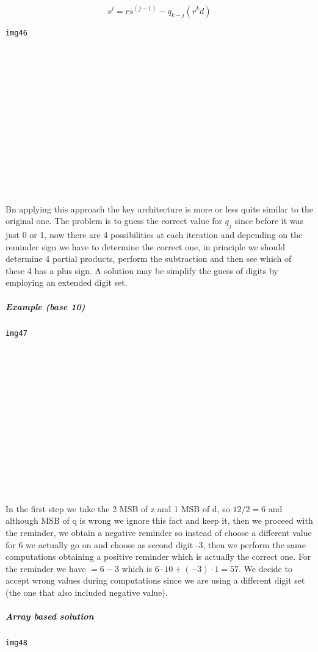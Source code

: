 $$s^{j}=rs^{(j-1)}-q_{k-j} (r^k d)$$

\begin{verbatim}
img46














\end{verbatim}

Bn applying this approach the key architecture is more or less quite similar to the original one. The problem is to guess the correct value for $q_j$ since before it was just 0 or 1, now there are 4 possibilities at each iteration and depending on the reminder sign we have to determine the correct one, in principle we should determine 4 partial products, perform the subtraction and then see which of these 4 has a plus sign. A solution may be simplify the guess of digits by employing an extended digit set.

\subparagraph{Example (base 10)}

\begin{verbatim}
img47














\end{verbatim}
In the first step we take the 2 MSB of z and 1 MSB of d, so $12/2=6$ and although MSB of q is wrong we ignore this fact and keep it, then we proceed with the reminder, we obtain a negative reminder so instead of choose a different value for 6 we actually go on and choose as second digit -3, then we perform the same computations obtaining a positive reminder which is actually the correct one. For the reminder we have $= 6 -3$ which is $6 \cdot 10+(-3) \cdot 1=57$. We decide to accept wrong values during computations since we are using a different digit set (the one that also included negative value).

\subparagraph{Array based solution}

\begin{verbatim}
img48



















\end{verbatim}

